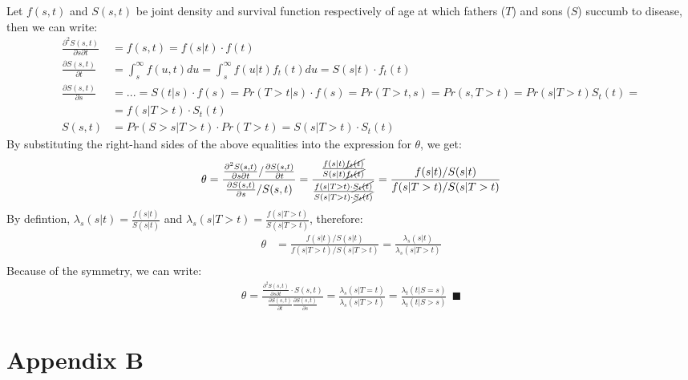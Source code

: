\documentclass[]{article}
\begin{document}
Let $f(s,t)$ and $S(s,t)$ be joint density and survival function respectively of age at which fathers ($T$) and sons ($S$) succumb to disease, then we can write:
	$$
	\begin{aligned}
		\frac{\partial^2 S(s, t)}{\partial s\partial t} &= f(s,t) = f(s|t)\cdot f(t)\\
		\frac{\partial S(s,t)}{\partial t} &= \int_s^{\infty}f(u, t)du = \int_s^{\infty}f(u|t)f_t(t)du = S(s|t)\cdot f_t(t)\\
		\frac{\partial S(s,t)}{\partial s} &=...= S(t|s)\cdot f(s) = Pr(T>t|s)\cdot f(s) = Pr(T>t, s) = Pr(s,T>t) = Pr(s|T>t)S_t(t) = \\
		&=f(s|T>t)\cdot S_t(t)\\
		S(s,t) &= Pr(S>s|T>t)\cdot Pr(T>t) = S(s|T>t)\cdot S_t(t)
	\end{aligned}
	$$
By substituting the right-hand sides of the above equalities into the expression for $\theta$, we get:
	$$
	\begin{aligned}
		\theta &= \frac{\frac{\partial^2 S(s, t)}{\partial s\partial t}/\frac{\partial S(s, t)}{\partial t}}  {\frac{\partial S(s, t)}{\partial s}/ S(s, t) } = \frac{  \frac{f(s|t)\cancel{f_t(t)}}{S(s|t)\cancel{f_t(t)}} } { \frac{f(s|T>t)\cdot \cancel{S_t(t)}}{S(s|T>t)\cdot \cancel{S_t(t)}}  }
		  = \frac{f(s|t)/S(s|t)}     {f(s|T>t) / S(s|T>t) }\\
	\end{aligned}
	$$
By defintion, $\lambda_s(s|t) = \frac{f(s|t)}{S(s|t)}$ and $\lambda_s(s|T>t) = \frac{f(s|T>t)}{S(s|T>t)}$, therefore:
	$$
	\begin{aligned}
		\theta &=\frac{f(s|t)/S(s|t)}     {f(s|T>t) / S(s|T>t) }
		= \frac{\lambda_s(s|t) } {\lambda_s(s|T>t) }\\
	\end{aligned}
	$$
Because of the symmetry, we can write:
	$$
	\begin{aligned}
	  \theta = \frac{ \frac{\partial^2 S(s, t)}{\partial s\partial t} \cdot S(s, t)}    {\frac{\partial S(s, t)}{\partial t} \frac{\partial S(s, t)}{\partial s}} = \frac{ \lambda_s(s|T=t)}{\lambda_s(s|T>t)} = \frac{ \lambda_t(t|S=s)}{\lambda_t(t|S>s)}~~\blacksquare
	\end{aligned}
	$$
\clearpage

\section*{Appendix B} \label{appendixB}
\end{document}
